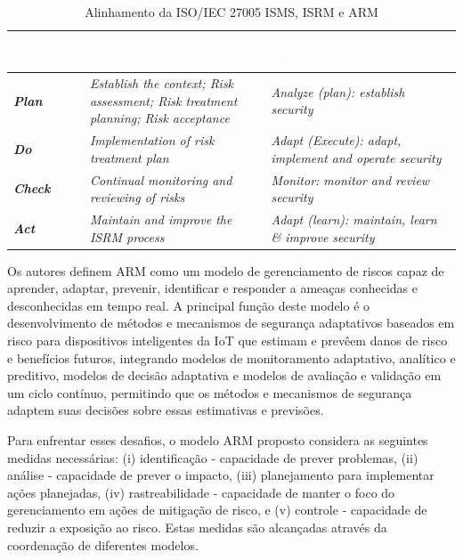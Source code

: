 \documentclass[tid,table]{texufpel} %
\begin{document}
        \begin{table}[h]
        \centering
	\caption{Alinhamento da ISO/IEC 27005 ISMS, ISRM e ARM}
	\label{aligment-iso-27005}
	\begin{tabular}{p{2cm}|p{6cm}|p{6cm}}
	\rowcolor[HTML]{003366}
	\textcolor{white}{\textbf{Processo ISMS}} & \textcolor{white}{\textbf{Processo ISRM}} & \textcolor{white}{\textbf{Processo/Metodologia ARM Proposto}} \\
	\hline
	\cellcolor[HTML]{E5EAEA} \textbf{\textit{Plan}} & \textit{Establish the context; Risk assessment; Risk treatment planning; Risk acceptance} & \textit{Analyze (plan): establish security} \\
	\hline
	\cellcolor[HTML]{E5EAEA} \textbf{\textit{Do}} & \textit{Implementation of risk treatment plan} & \textit{Adapt (Execute): adapt, implement and operate security} \\
	\hline
	\cellcolor[HTML]{E5EAEA} \textbf{\textit{Check}} & \textit{Continual monitoring and reviewing of risks} & \textit{Monitor: monitor and review security} \\
	\hline
	\cellcolor[HTML]{E5EAEA} \textbf{\textit{Act}} & \textit{Maintain and improve the ISRM process} & \textit{Adapt (learn): maintain, learn \& improve security}
	\end{tabular}
	\end{table}

Os autores definem ARM como um modelo de gerenciamento de riscos capaz de aprender, adaptar, prevenir, identificar e responder a ameaças conhecidas e desconhecidas em tempo real. A principal função deste modelo é o desenvolvimento de métodos e mecanismos de segurança adaptativos baseados em risco para dispositivos inteligentes da IoT que estimam e prevêem danos de risco e benefícios futuros, integrando modelos de monitoramento adaptativo, analítico e preditivo, modelos de decisão adaptativa e modelos de avaliação e validação em um ciclo contínuo, permitindo que os métodos e mecanismos de segurança adaptem suas decisões sobre essas estimativas e previsões.

Para enfrentar esses desafios, o modelo ARM proposto considera as seguintes medidas necessárias: (i) identificação - capacidade de prever problemas, (ii) análise - capacidade de prever o impacto, (iii) planejamento para implementar ações planejadas, (iv) rastreabilidade - capacidade de manter o foco do gerenciamento em ações de mitigação de risco, e (v) controle - capacidade de reduzir a exposição ao risco. Estas medidas são alcançadas através da coordenação de diferentes modelos.
\end{document}
